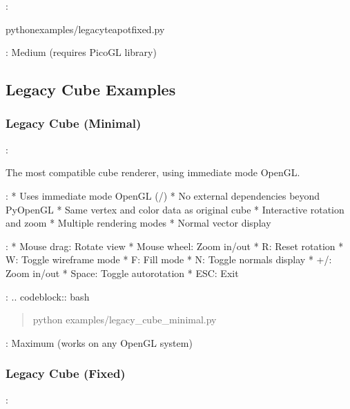 \documentclass[a4paper,10pt,english,openany,oneside]{sphinxmanual}
\begin{document}
\sphinxAtStartPar
{}:

\begin{sphinxVerbatim}[commandchars=\\\{\}]
pythonexamples/legacy\PYGZus{}teapot\PYGZus{}fixed.py
\end{sphinxVerbatim}

\sphinxAtStartPar
{}: Medium (requires PicoGL library)


\subsection{Legacy Cube Examples}
\label{\detokenize{legacy_examples:legacy-cube-examples}}

\subsubsection{Legacy Cube (Minimal)}
\label{\detokenize{legacy_examples:legacy-cube-minimal}}
\sphinxAtStartPar
{}: 

\sphinxAtStartPar
The most compatible cube renderer, using immediate mode OpenGL.

\sphinxAtStartPar
{}:
* Uses immediate mode OpenGL (/)
* No external dependencies beyond PyOpenGL
* Same vertex and color data as original cube
* Interactive rotation and zoom
* Multiple rendering modes
* Normal vector display

\sphinxAtStartPar
{}:
* Mouse drag: Rotate view
* Mouse wheel: Zoom in/out
* R: Reset rotation
* W: Toggle wireframe mode
* F: Fill mode
* N: Toggle normals display
* +/\sphinxhyphen{}: Zoom in/out
* Space: Toggle auto\sphinxhyphen{}rotation
* ESC: Exit

\sphinxAtStartPar
{}:
.. code\sphinxhyphen{}block:: bash
\begin{quote}

\sphinxAtStartPar
python examples/legacy\_cube\_minimal.py
\end{quote}

\sphinxAtStartPar
{}: Maximum (works on any OpenGL system)


\subsubsection{Legacy Cube (Fixed)}
\label{\detokenize{legacy_examples:legacy-cube-fixed}}
\sphinxAtStartPar
{}: 
\end{document}
